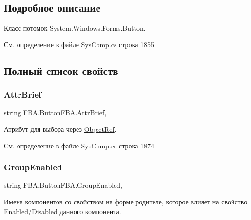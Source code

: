 \subsection{Подробное описание}
Класс потомок System.\+Windows.\+Forms.\+Button. 



См. определение в файле Sys\+Comp.\+cs строка 1855



\subsection{Полный список свойств}
\mbox{\label{class_f_b_a_1_1_button_f_b_a_a2d52aeeec4a7287c1b1f7d38b81cadef}} 
\subsubsection{\texorpdfstring{Attr\+Brief}{AttrBrief}}
{\footnotesize\ttfamily string F\+B\+A.\+Button\+F\+B\+A.\+Attr\+Brief\hspace{0.3cm}{\ttfamily [get]}, {\ttfamily [set]}}



Атрибут для выбора через \mbox{\hyperlink{class_f_b_a_1_1_object_ref}{Object\+Ref}}. ~\newline




См. определение в файле Sys\+Comp.\+cs строка 1874

\mbox{\label{class_f_b_a_1_1_button_f_b_a_af65d7e3f07778e5c9c790ea109f264b9}} 
\subsubsection{\texorpdfstring{Group\+Enabled}{GroupEnabled}}
{\footnotesize\ttfamily string F\+B\+A.\+Button\+F\+B\+A.\+Group\+Enabled\hspace{0.3cm}{\ttfamily [get]}, {\ttfamily [set]}}



Имена компонентов со свойством на форме родителе, которое влияет на свойство Enabled/\+Disabled данного компонента. ~\newline




